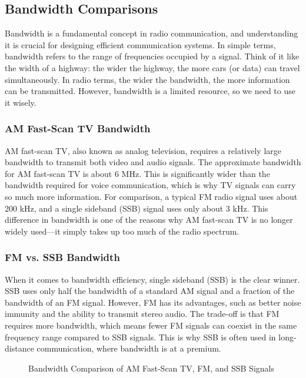 \subsection{Bandwidth Comparisons}
\label{subsec:bandwidth}

Bandwidth is a fundamental concept in radio communication, and understanding it is crucial for designing efficient communication systems. In simple terms, bandwidth refers to the range of frequencies occupied by a signal. Think of it like the width of a highway: the wider the highway, the more cars (or data) can travel simultaneously. In radio terms, the wider the bandwidth, the more information can be transmitted. However, bandwidth is a limited resource, so we need to use it wisely.

\subsubsection*{AM Fast-Scan TV Bandwidth}
AM fast-scan TV, also known as analog television, requires a relatively large bandwidth to transmit both video and audio signals. The approximate bandwidth for AM fast-scan TV is about 6 MHz. This is significantly wider than the bandwidth required for voice communication, which is why TV signals can carry so much more information. For comparison, a typical FM radio signal uses about 200 kHz, and a single sideband (SSB) signal uses only about 3 kHz. This difference in bandwidth is one of the reasons why AM fast-scan TV is no longer widely used—it simply takes up too much of the radio spectrum.

\subsubsection*{FM vs. SSB Bandwidth}
When it comes to bandwidth efficiency, single sideband (SSB) is the clear winner. SSB uses only half the bandwidth of a standard AM signal and a fraction of the bandwidth of an FM signal. However, FM has its advantages, such as better noise immunity and the ability to transmit stereo audio. The trade-off is that FM requires more bandwidth, which means fewer FM signals can coexist in the same frequency range compared to SSB signals. This is why SSB is often used in long-distance communication, where bandwidth is at a premium.

\begin{figure}[h]
    \centering
    \caption{Bandwidth Comparison of AM Fast-Scan TV, FM, and SSB Signals}
    \label{fig:bandwidth-comparison}
\end{figure}

